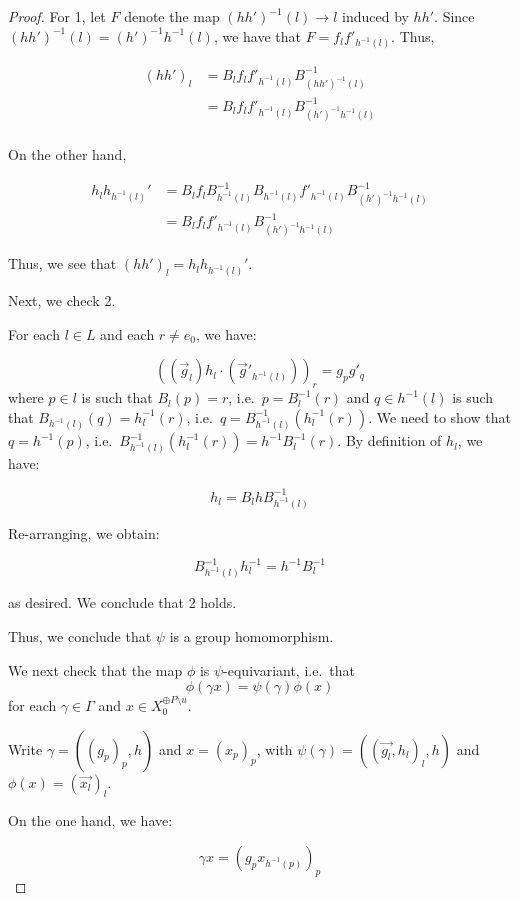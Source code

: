 \documentclass[12pt]{article}
\theoremstyle{definition}
\begin{document}
\begin{proof}
    For 1, let $F$ denote the map $(hh')^{-1}(l) \to l$ induced by $hh'$. Since $(hh')^{-1}(l) = (h')^{-1}h^{-1}(l)$, we have that $F = f_l f'_{h^{-1}(l)}$. Thus,

    \begin{align*}
        (hh')_l &= B_l  f_l f'_{h^{-1}(l)} B_{(hh')^{-1}(l)}^{-1} \\
        &= B_l f_l f'_{h^{-1}(l)} B_{(h')^{-1}h^{-1}(l)}^{-1} \\
    \end{align*}

    On the other hand, 

    \begin{align*}
        h_lh_{h^{-1}(l)}' &= B_l f_l B_{h^{-1}(l)}^{-1} B_{h^{-1}(l)} f'_{h^{-1}(l)} B_{(h')^{-1}h^{-1}(l)}^{-1} \\
        &= B_l f_l f'_{h^{-1}(l)}B_{(h')^{-1}h^{-1}(l)}^{-1} 
    \end{align*}

    Thus, we see that $(hh')_l = h_lh_{h^{-1}(l)}'$. 

    Next, we check 2.

    For each $l \in L$ and each $r \neq e_0$, we have: 

    $$((\vec{g}_l)h_l \cdot(\vec{g}'_{h^{-1}(l)}))_r = g_p g'_q$$
    where $p \in l$ is such that $B_l(p) = r$, i.e.\ $p = B_l^{-1}(r)$ and $q \in h^{-1}(l)$ is such that $B_{h^{-1}(l)}(q) = h_l^{-1}(r)$, i.e.\ $q = B_{h^{-1}(l)}^{-1}(h_l^{-1}(r))$. We need to show that $q = h^{-1}(p)$, i.e.\ $B_{h^{-1}(l)}^{-1}(h_l^{-1}(r)) = h^{-1}B_l^{-1}(r)$. By definition of $h_{l}$, we have:

    $$h_l = B_lhB_{h^{-1}(l)}^{-1}$$

    Re-arranging, we obtain: 

    $$B_{h^{-1}(l)}^{-1}h_l^{-1} = h^{-1}B_l^{-1}$$

    as desired. We conclude that 2 holds. 

    Thus, we conclude that $\psi$ is a group homomorphism. 

    We next check that the map $\phi$ is $\psi$-equivariant, i.e.\ that $$\phi(\gamma x) = \psi(\gamma) \phi(x)$$ for each $\gamma \in \Gamma$ and $x \in X_0^{\oplus P \setminus u}$.

    Write $\gamma = ((g_p)_p, h)$ and $x = (x_p)_p$, with $\psi(\gamma) = ((\vec{g_l}, h_l)_l, h)$ and $\phi(x) = (\vec{x_l})_l$. 

    On the one hand, we have: 

    $$\gamma x = (g_p x_{h^{-1}(p)})_p$$


\end{proof}
\end{document}
